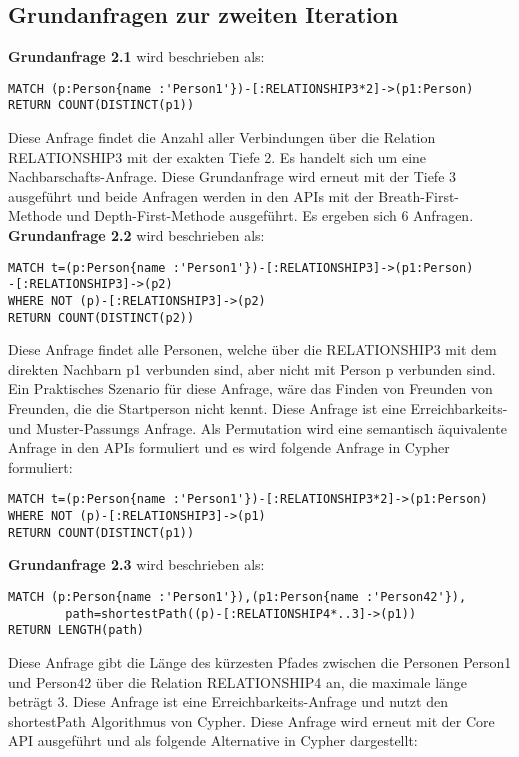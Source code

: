 \subsection{Grundanfragen zur zweiten Iteration}
\textbf{Grundanfrage 2.1} wird beschrieben als: 
\begin{Verbatim}[frame=single]
MATCH (p:Person{name :'Person1'})-[:RELATIONSHIP3*2]->(p1:Person) 
RETURN COUNT(DISTINCT(p1))
\end{Verbatim} 
Diese Anfrage findet die Anzahl aller Verbindungen über die Relation RELATIONSHIP3 mit der exakten Tiefe 2. Es handelt sich um eine Nachbarschafts-Anfrage. Diese Grundanfrage wird erneut mit der Tiefe 3 ausgeführt und beide Anfragen werden in den APIs mit der Breath-First-Methode und Depth-First-Methode ausgeführt. Es ergeben sich 6 Anfragen. \newline
\textbf{Grundanfrage 2.2} wird beschrieben als: 
\begin{Verbatim}[frame=single]
MATCH t=(p:Person{name :'Person1'})-[:RELATIONSHIP3]->(p1:Person)
-[:RELATIONSHIP3]->(p2)
WHERE NOT (p)-[:RELATIONSHIP3]->(p2) 
RETURN COUNT(DISTINCT(p2))
\end{Verbatim} 
Diese Anfrage findet alle Personen, welche über die RELATIONSHIP3 mit dem direkten Nachbarn  p1 verbunden sind, aber nicht mit Person p verbunden sind. Ein Praktisches Szenario für diese Anfrage, wäre das Finden von Freunden von Freunden, die die Startperson nicht kennt. Diese Anfrage ist eine Erreichbarkeits- und Muster-Passungs Anfrage. Als Permutation wird eine semantisch äquivalente Anfrage in den APIs formuliert und es wird folgende Anfrage in Cypher formuliert:
\begin{Verbatim}[frame=single]
MATCH t=(p:Person{name :'Person1'})-[:RELATIONSHIP3*2]->(p1:Person)
WHERE NOT (p)-[:RELATIONSHIP3]->(p1)
RETURN COUNT(DISTINCT(p1))
\end{Verbatim} 
\textbf{Grundanfrage 2.3} wird beschrieben als: 
\begin{Verbatim}[frame=single]
MATCH (p:Person{name :'Person1'}),(p1:Person{name :'Person42'}),
		path=shortestPath((p)-[:RELATIONSHIP4*..3]->(p1)) 
RETURN LENGTH(path)
\end{Verbatim} 
Diese Anfrage gibt die Länge des kürzesten Pfades zwischen die Personen Person1 und Person42 über die Relation RELATIONSHIP4 an, die maximale länge beträgt 3. Diese Anfrage ist eine Erreichbarkeits-Anfrage und nutzt den shortestPath Algorithmus von Cypher. Diese Anfrage wird erneut mit der Core API ausgeführt und als folgende Alternative in Cypher dargestellt: 
